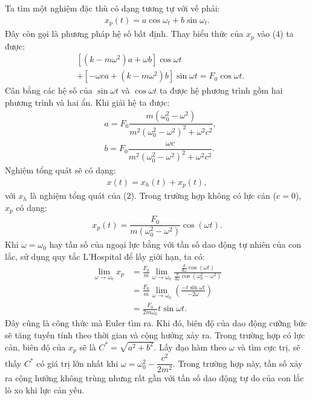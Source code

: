 \begin{multicols}{2}
	\vskip 0.1cm
	Ta tìm một nghiệm đặc thù có dạng tương tự với vế phải:
	\begin{align*}
		x_p(t) = a \cos \omega_t + b\sin\omega_t.
	\end{align*}
	Đây còn gọi là phương pháp  hệ số bất định. Thay biểu thức của $x_p$ vào ($4$) ta được:
	\begin{align*}
		&[(k - m\omega^2)a + \omega b]\cos\omega t \\
		&+  [-\omega ca + (k- m\omega^2)b]\sin \omega t = F_0\cos \omega t.
	\end{align*}
	Cân bằng các hệ số của $\sin\omega t$ và $\cos\omega t$ ta được hệ phương trình gồm hai phương trình và hai ẩn. Khi giải hệ ta được:
	\begin{align*}
		&a = F_0 \dfrac{m(\omega_0^2 - \omega^2)}{m^2(\omega_0^2 - \omega^2)^2 + \omega^2c^2},\\
		&b = F_0 \dfrac{\omega c}{m^2(\omega_0^2 - \omega^2)^2 + \omega^2c^2}.
	\end{align*}
	Nghiệm tổng quát sẽ có dạng:
	\begin{align*}
		x(t) = x_h(t) + x_p(t),
	\end{align*}
	với $x_h$ là nghiệm tổng quát của ($2$).
	\vskip 0.1cm
	Trong trường hợp không có lực cản ($c=0$), $x_p$ có dạng:
	\begin{align*}
		x_p(t) = \dfrac{F_0}{m(\omega_0^2 - \omega^2)}\cos(\omega t).
	\end{align*}
	Khi $\omega = \omega_0$ hay tần số của ngoại lực bằng với tần số dao động tự nhiên của con lắc, sử dụng quy tắc L'Hospital để lấy giới hạn, ta có:
	\begin{align*}
		\mathop {\lim }\limits_{\omega  \to {\omega _0}} {x_p} &= \frac{{{F_0}}}{m}\mathop {\lim }\limits_{\omega  \to {\omega _0}} \frac{{\frac{d}{{d\omega }}\cos (\omega t)}}{{\frac{d}{{d\omega }}\cos (\omega _0^2 - {\omega ^2})}} \\
		&= \frac{{{F_0}}}{m}\mathop {\lim }\limits_{\omega  \to {\omega _0}} \left( {\frac{{ - t\sin \omega t}}{{ - 2\omega }}} \right)\\
		& = \frac{{{F_0}}}{{2m{\omega _0}}}t\sin \omega t.
	\end{align*}
	Đây cũng là công thức mà Euler tìm ra. Khi đó, biên độ của dao động cưỡng bức sẽ tăng tuyến tính theo thời gian và cộng hưởng xảy ra.
	\vskip 0.1cm
	Trong trường hợp có lực cản, biên độ của $x_p$ sẽ là $C^*=\sqrt{a^2 + b^2}$. Lấy đạo hàm theo $\omega$ và tìm cực trị, sẽ thấy $C^*$ có giá trị lớn nhất khi $\omega = \omega_0^2 - \dfrac{c^2}{2m^2}$. Trong trường hợp này, tần số xảy ra cộng hưởng không trùng nhưng rất gần với tần số dao động tự do của con lắc lò xo khi lực cản yếu.

\end{multicols}
